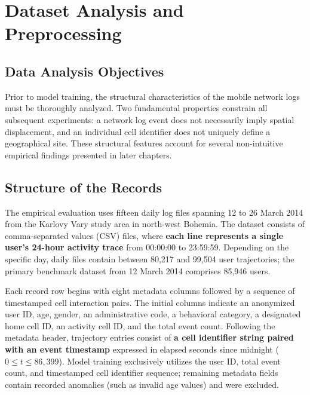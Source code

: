 \chapter{Dataset Analysis and Preprocessing}
\label{ch:data}

\section{Data Analysis Objectives}

Prior to model training, the structural characteristics of the mobile network logs must be thoroughly analyzed. Two fundamental properties constrain all subsequent experiments: a network log event does not necessarily imply spatial displacement, and an individual cell identifier does not uniquely define a geographical site. These structural features account for several non-intuitive empirical findings presented in later chapters.

\section{Structure of the Records}

The empirical evaluation uses fifteen daily log files spanning 12 to 26 March 2014 from the Karlovy Vary study area in north-west Bohemia. The dataset consists of comma-separated values (CSV) files, where \textbf{each line represents a single user's 24-hour activity trace} from 00:00:00 to 23:59:59. Depending on the specific day, daily files contain between 80,217 and 99,504 user trajectories; the primary benchmark dataset from 12 March 2014 comprises 85,946 users.

Each record row begins with eight metadata columns followed by a sequence of timestamped cell interaction pairs. The initial columns indicate an anonymized user ID, age, gender, an administrative code, a behavioral category, a designated home cell ID, an activity cell ID, and the total event count. Following the metadata header, trajectory entries consist of \textbf{a cell identifier string paired with an event timestamp} expressed in elapsed seconds since midnight ($0 \le t \le 86,399$). Model training exclusively utilizes the user ID, total event count, and timestamped cell identifier sequence; remaining metadata fields contain recorded anomalies (such as invalid age values) and were excluded.

